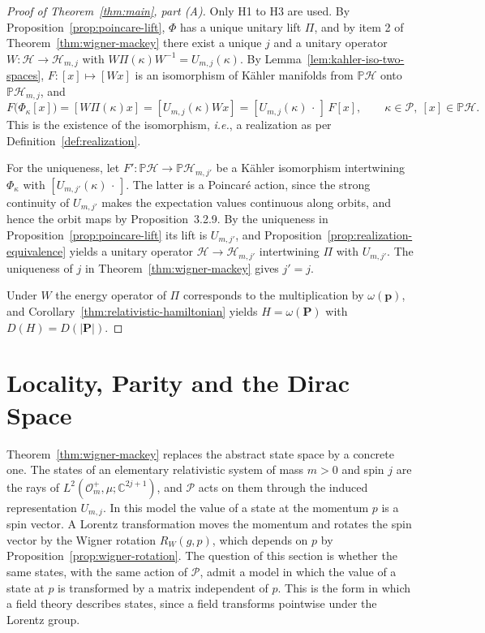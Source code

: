 \begin{proof}[Proof of Theorem~\ref{thm:main}, part (A)]
	Only H1 to H3 are used. By Proposition~\ref{prop:poincare-lift}, $\Phi$ has a unique unitary lift $\Pi$, and by item 2 of Theorem~\ref{thm:wigner-mackey} there exist a unique $j$ and a unitary operator $W:\mathcal{H}\to\mathcal{H}_{m,j}$ with $W\Pi(\kappa)W^{-1}=U_{m,j}(\kappa)$. By Lemma~\ref{lem:kahler-iso-two-spaces}, $F:[x]\mapsto[Wx]$ is an isomorphism of Kähler manifolds from $\mathbb{P}\mathcal{H}$ onto $\mathbb{P}\mathcal{H}_{m,j}$, and
	\begin{equation*}
		F\big(\Phi_\kappa[x]\big)=[W\Pi(\kappa)x]=[U_{m,j}(\kappa)Wx]=[U_{m,j}(\kappa)\,\cdot\,]\,F[x],\qquad \kappa\in\mathcal{P},\ [x]\in\mathbb{P}\mathcal{H}.
	\end{equation*}
	This is the existence of the isomorphism, \textit{i.e.}, a realization as per Definition~\ref{def:realization}.
	
	For the uniqueness, let $F':\mathbb{P}\mathcal{H}\to\mathbb{P}\mathcal{H}_{m,j'}$ be a Kähler isomorphism intertwining $\Phi_\kappa$ with $[U_{m,j'}(\kappa)\,\cdot\,]$. The latter is a Poincar\'e action, since the strong continuity of $U_{m,j'}$ makes the expectation values continuous along orbits, and hence the orbit maps by Proposition~3.2.9. By the uniqueness in Proposition~\ref{prop:poincare-lift} its lift is $U_{m,j'}$, and Proposition~\ref{prop:realization-equivalence} yields a unitary operator $\mathcal{H}\to\mathcal{H}_{m,j'}$ intertwining $\Pi$ with $U_{m,j'}$. The uniqueness of $j$ in Theorem~\ref{thm:wigner-mackey} gives $j'=j$.
	
	Under $W$ the energy operator of $\Pi$ corresponds to the multiplication by $\omega(\mathbf{p})$, and Corollary~\ref{thm:relativistic-hamiltonian} yields $H=\omega(\mathbf{P})$ with $D(H)=D(|\mathbf{P}|)$.
\end{proof}

\section{Locality, Parity and the Dirac Space}
\label{sec:locality}

Theorem~\ref{thm:wigner-mackey} replaces the abstract state space by a concrete one. The states of an elementary relativistic system of mass $m>0$ and spin $j$ are the rays of $L^2(\mathcal{O}_m^+,\mu;\mathbb{C}^{2j+1})$, and $\mathcal{P}$ acts on them through the induced representation $U_{m,j}$. In this model the value of a state at the momentum $p$ is a spin vector. A Lorentz transformation moves the momentum and rotates the spin vector by the Wigner rotation $R_W(g,p)$, which depends on $p$ by Proposition~\ref{prop:wigner-rotation}. The question of this section is whether the same states, with the same action of $\mathcal{P}$, admit a model in which the value of a state at $p$ is transformed by a matrix independent of $p$. This is the form in which a field theory describes states, since a field transforms pointwise under the Lorentz group.

